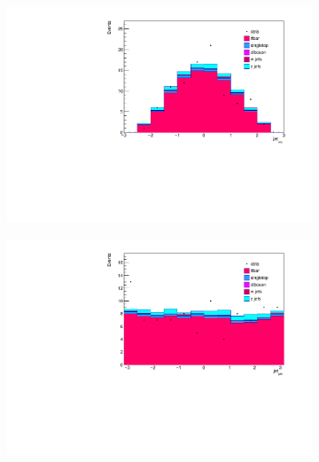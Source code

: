 \begin{figure}
  \begin{subfigure}{0.5\textwidth}
    \centering
    \includegraphics[width=\linewidth]{plots_and_txt/stacked_plots/stacked_jet_eta.pdf}
    \caption{}
    \label{fig:stacked_lep_pt4}
  \end{subfigure}%
  \begin{subfigure}{0.5\textwidth}
    \centering
    \includegraphics[width=\linewidth]{plots_and_txt/stacked_plots/stacked_jet_phi.pdf}
    \caption{}
    \label{fig:stacked_btagged4}
  \end{subfigure}%
  \newline
  \begin{subfigure}{0.5\textwidth}
    \centering

\end{subfigure}
\end{figure}
